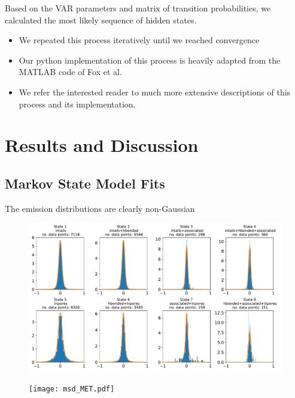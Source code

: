 \documentclass{article}
\begin{document}
  Based on the VAR parameters and matrix of transition probabilities, we calculated
  the most likely sequence of hidden states.
  \begin{itemize}
    \item We repeated this process iteratively until we reached convergence %
    \item Our python implementation of this process is heavily adapted from the MATLAB code
    of Fox et al.~\cite{fox_sticky_2007} 
    \item We refer the interested reader to much more extensive descriptions of 
    this process and its implementation. 
    ~\cite{beal_infinite_2002,teh_hierarchical_2006,van_gael_beam_2008,fox_nonparametric_2009,fox_bayesian_2010}
  \end{itemize}
   
  \section{Results and Discussion}
  
  \subsection{Markov State Model Fits}\label{section:msm_results}
  
  The emission distributions are clearly non-Gaussian
  
  \begin{figure}
  \includegraphics[width=\textwidth]{emissions_MET.pdf}
  \caption{}\label{fig:emissions_MET}
  \end{figure}

  \begin{figure}
  \texttt{[image: msd\_MET.pdf]}
  \caption{}\label{fig:msd_MET}
  \end{figure}
\end{document}
